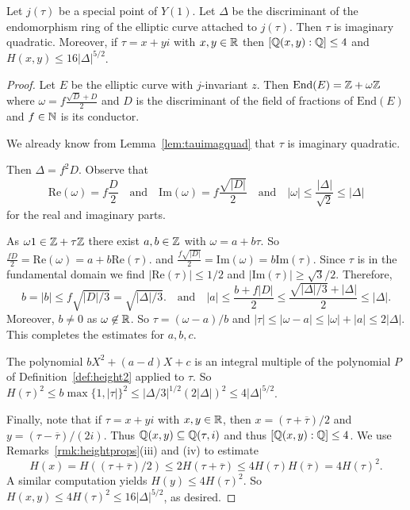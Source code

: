 \begin{lemma}
  \label{lem:heighttaubound}
  Let $j(\tau)$ be a special point of $Y(1)$.
  Let $\Delta$ be the discriminant of
  the endomorphism ring of the elliptic curve attached to $j(\tau)$.
  Then $\tau$ is imaginary quadratic. Moreover, if $\tau =x+yi$ with
  $x,y\in{\mathbb{R}}$ then $[{\mathbb{Q}}(x,y):{\mathbb{Q}}]\le 4$ and $H(x,y)\le 16|\Delta|^{5/2}$.
\end{lemma}
\begin{proof}  
  Let $E$ be the elliptic curve with $j$-invariant $z$. Then
  $\mathrm{End}(E) = {\mathbb{Z}} + \omega {\mathbb{Z}}$ where $\omega = f
  \frac{\sqrt{D}+D}{2}$ and $D$ is the discriminant of the field of
  fractions of $\mathrm{End}(E)$ and $f\in{\mathbb{N}}$ is its conductor.

  We already know from Lemma~\ref{lem:tauimagquad} that $\tau$ is
  imaginary quadratic.
  
  Then $\Delta = f^2D$. Observe that
  \begin{equation*}
    \mathrm{Re}(\omega) = f\frac{D}{2} \quad\text{and}\quad
    \mathrm{Im}(\omega) = f\frac{\sqrt{|D|}}{2}
    \quad\text{and}\quad
    |\omega| \le \frac{|\Delta|}{\sqrt{2}}\le|\Delta|
  \end{equation*}
  for the real and imaginary parts. 

  As $\omega 1 \in{\mathbb{Z}}+\tau{\mathbb{Z}}$ there exist $a,b\in{\mathbb{Z}}$ with
  $\omega=a+b\tau$. So $\frac{fD}{2}=\mathrm{Re}(\omega) =
  a+b\mathrm{Re}(\tau)$. and $\frac{f\sqrt{|D|}}{2}=\mathrm{Im}(\omega)
  = b \mathrm{Im}(\tau)$. Since $\tau$ is in the fundamental domain we
  find $|\mathrm{Re}(\tau)|\le 1/2$ and $|\mathrm{Im}(\tau)|\ge
  \sqrt{3}/2$. Therefore,
  \begin{equation*}
    b=|b|\le {f \sqrt{|D|/3}} = \sqrt{|\Delta|/3}.
    \quad\text{and}\quad
    |a|\le \frac{b+f|D|}{2} \le \frac{\sqrt{|\Delta|/3} +
      |\Delta|}{2} \le |\Delta|. 
  \end{equation*}
  Moreover, $b\not=0$ as $\omega\not\in{\mathbb{R}}$. So
  $\tau = (\omega-a)/b$ and $|\tau|\le
  |\omega-a|\le|\omega|+|a| \le 2|\Delta| $.
  This completes the estimates for $a,b,c$. 


  The polynomial $bX^2+(a-d)X+c$ is an integral multiple of the
  polynomial $P$ of Definition~\ref{def:height2} applied to $\tau$.
  So $H(\tau)^2 \le b\max\{1,|\tau|\}^2 \le |\Delta/3|^{1/2}
  (2|\Delta|)^2 \le 4|\Delta|^{5/2}$.
  
  Finally, note that if $\tau=x+yi$ with $x,y\in{\mathbb{R}}$, then $x =
  (\tau+\overline\tau)/2$ and $y = (\tau-\overline \tau)/(2i)$. 
  Thus ${\mathbb{Q}}(x,y)\subseteq {\mathbb{Q}}(\tau,i)$ and thus $[{\mathbb{Q}}(x,y):{\mathbb{Q}}]\le 4$. 
  We use Remarks~\ref{rmk:heightprops}(iii) and (iv) to estimate
  \begin{equation*}
    H(x) = H((\tau+\overline\tau)/2)\le 2H(\tau+\overline\tau)\le
    4H(\tau)H(\overline\tau) = 4H(\tau)^2.
  \end{equation*}
  A similar computation yields $H(y)\le 4H(\tau)^2$. So
  $H(x,y)\le 4H(\tau)^2 \le 16 |\Delta|^{5/2}$, as desired. 
\end{proof}


